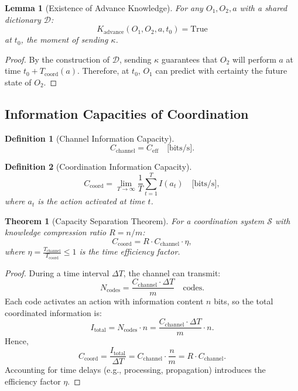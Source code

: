 \documentclass[12pt]{article}
\newtheorem{definition}{Definition}
\newtheorem{theorem}{Theorem}
\newtheorem{lemma}{Lemma}
\begin{document}
	\begin{lemma}[Existence of Advance Knowledge]
		\label{lem:advance-knowledge}
		For any $O_1, O_2, a$ with a shared dictionary $\mathcal{D}$:
		\[
		K_{\text{advance}}(O_1, O_2, a, t_0) = \text{True}
		\]
		at $t_0$, the moment of sending $\kappa$.
	\end{lemma}
	
	\begin{proof}
		By the construction of $\mathcal{D}$, sending $\kappa$ guarantees that $O_2$ will perform $a$ at time $t_0 + T_{\text{coord}}(a)$. Therefore, at $t_0$, $O_1$ can predict with certainty the future state of $O_2$.
	\end{proof}
	
	\subsection{Information Capacities of Coordination}
	\label{app:capacities}
	
	\begin{definition}[Channel Information Capacity]
		\[
		C_{\text{channel}} = C_{\text{eff}} \quad \text{[bits/s]}.
		\]
	\end{definition}
	
	\begin{definition}[Coordination Information Capacity]
		\[
		C_{\text{coord}} = \lim_{T \to \infty} \frac{1}{T} \sum_{t=1}^{T} I(a_t) \quad \text{[bits/s]},
		\]
		where $a_t$ is the action activated at time $t$.
	\end{definition}
	
	\begin{theorem}[Capacity Separation Theorem]
		\label{thm:capacity-separation}
		For a coordination system $\mathcal{S}$ with knowledge compression ratio $R = n/m$:
		\[
		C_{\text{coord}} = R \cdot C_{\text{channel}} \cdot \eta,
		\]
		where $\eta = \frac{T_{\text{channel}}}{T_{\text{coord}}} \leq 1$ is the time efficiency factor.
	\end{theorem}
	
	\begin{proof}
		During a time interval $\Delta T$, the channel can transmit:
		\[
		N_{\text{codes}} = \frac{C_{\text{channel}} \cdot \Delta T}{m} \quad \text{codes}.
		\]
		Each code activates an action with information content $n$ bits, so the total coordinated information is:
		\[
		I_{\text{total}} = N_{\text{codes}} \cdot n = \frac{C_{\text{channel}} \cdot \Delta T}{m} \cdot n.
		\]
		Hence,
		\[
		C_{\text{coord}} = \frac{I_{\text{total}}}{\Delta T} = C_{\text{channel}} \cdot \frac{n}{m} = R \cdot C_{\text{channel}}.
		\]
		Accounting for time delays (e.g., processing, propagation) introduces the efficiency factor $\eta$.
	\end{proof}
	
\end{document}
